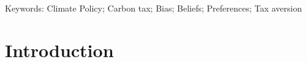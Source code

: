\documentclass[12pt]{article} %
\begin{document}
Keywords: Climate Policy; Carbon tax; Bias; Beliefs; Preferences; Tax aversion %

\newpage

\newpage
\section{Introduction}


\end{document}
